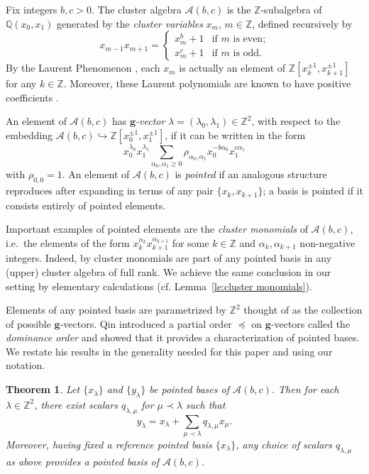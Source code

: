 \documentclass{amsart}
\newtheorem{theorem}{Theorem}
\numberwithin{theorem}{section}
\newcommand{\bfg}{\boldsymbol{g}}
\newcommand{\cA}{\mathcal{A}}
\newcommand{\QQ}{\mathbb{Q}}
\newcommand{\ZZ}{\mathbb{Z}}
\newcommand{\into}{\hookrightarrow}
\begin{document}
  Fix integers $b,c>0$.
  The cluster algebra $\cA(b,c)$ is the $\ZZ$-subalgebra of $\QQ(x_0,x_1)$ generated by the \emph{cluster variables} $x_m$, $m\in\ZZ$, defined recursively by
  \[
    x_{m-1}x_{m+1}=\begin{cases} x_m^b+1 & \text{if $m$ is even;}\\ x_m^c+1 & \text{if $m$ is odd.} \end{cases}
  \]
  By the Laurent Phenomenon \cite{FZ02}, each $x_m$ is actually an element of $\ZZ[x_k^{\pm1},x_{k+1}^{\pm1}]$ for any $k\in\ZZ$.
  Moreover, these Laurent polynomials are known to have positive coefficients \cite{GHKK18,LLZ14,LS15}.

  An element of $\cA(b,c)$ has \emph{$\bfg$-vector} $\lambda=(\lambda_0,\lambda_1)\in\ZZ^2$, with respect to the embedding ${\cA(b,c)\into\ZZ[x_0^{\pm1},x_{1}^{\pm1}]}$, if it can be written in the form
  \begin{equation}
    \label{eq:pointed}
    x_0^{\lambda_0}x_1^{\lambda_1}\sum\limits_{\alpha_0,\alpha_1 \ge 0} \rho_{\alpha_0,\alpha_1} x_0^{-b\alpha_0} x_1^{c\alpha_1}
  \end{equation}
  with $\rho_{0,0}=1$.
  An element of $\cA(b,c)$ is \emph{pointed} if an analogous structure reproduces after expanding in terms of any pair $\{x_k,x_{k+1}\}$; a basis is pointed if it consists entirely of pointed elements.

  Important examples of pointed elements are the \emph{cluster monomials} of $\cA(b,c)$, i.e.~the elements of the form $x_k^{\alpha_k}x_{k+1}^{\alpha_{k+1}}$ for some $k\in\ZZ$ and $\alpha_k,\alpha_{k+1}$ non-negative integers.
  Indeed, by \cite[Lemma 3.4.12]{Qin19} cluster monomials are part of any pointed basis in any (upper) cluster algebra of full rank.
  We achieve the same conclusion in our setting by elementary calculations (cf. Lemma~\ref{le:cluster monomials}).

  Elements of any pointed basis are parametrized by $\ZZ^2$ thought of as the collection of possible $\bfg$-vectors.
  Qin introduced a partial order $\preceq$ on $\bfg$-vectors called the \emph{dominance order} and showed that it provides a characterization of pointed bases.
  We restate his results in the generality needed for this paper and using our notation.
  \begin{theorem}
    \label{th:dominance}
    \cite[Theorem 1.2.1]{Qin19}
    Let $\{x_\lambda\}$ and $\{y_\lambda\}$ be pointed bases of $\cA(b,c)$.
    Then for each $\lambda\in\ZZ^2$, there exist scalars $q_{\lambda,\mu}$ for $\mu\prec\lambda$ such that
    \[y_\lambda=x_\lambda+\sum_{\mu\prec\lambda} q_{\lambda,\mu} x_\mu.\]
    Moreover, having fixed a reference pointed basis $\{x_\lambda\}$, any choice of scalars $q_{\lambda,\mu}$ as above provides a pointed basis of $\cA(b,c)$.
  \end{theorem}
\end{document}
